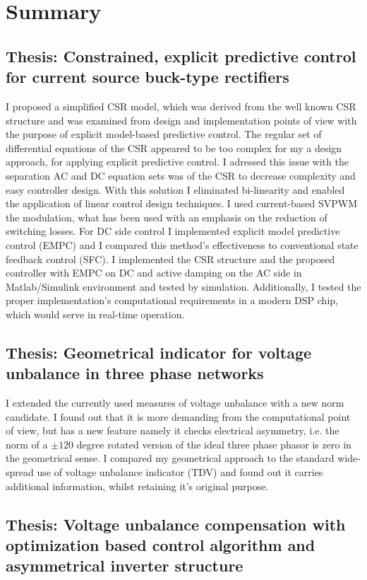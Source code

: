 \chapter{Summary}

\section{Thesis: Constrained, explicit predictive control for current source buck-type rectifiers}

    I proposed a simplified CSR model, which was derived from the well known CSR structure and was examined from design and implementation points of view with the purpose of explicit model-based predictive control. The regular set of differential equations of the CSR appeared to be too complex for my a design approach, for applying explicit predictive control. I adressed this issue with the separation AC and DC equation sets was of the CSR to decrease complexity and easy controller design. With this solution I eliminated bi-linearity and enabled the application of linear control design techniques. I used current-based SVPWM the modulation, what has been used with an emphasis on the reduction of switching losses. For DC side control I implemented explicit model predictive control (EMPC) and I compared this method's effectiveness to conventional state feedback control (SFC). I implemented the CSR structure and the proposed controller with EMPC on DC and active damping on the AC side in Matlab/Simulink environment and tested by simulation. Additionally, I tested the proper implementation's computational requirements in a modern DSP chip, which would serve in real-time operation.
		
\section{Thesis: Geometrical indicator for voltage unbalance in three phase networks}
    I extended the currently used measures of voltage unbalance with a new norm candidate. I found out that it is more demanding from the computational point of view, but has a new feature namely it checks electrical asymmetry, i.e. the norm of a $\pm120$ degree rotated version of the ideal three phase phasor is zero in the geometrical sense. I compared my geometrical approach to the standard wide-spread use of voltage unbalance indicator (TDV) and found out it carries additional information, whilst retaining it's original purpose.
		
\section{Thesis: Voltage unbalance compensation with optimization based control algorithm and asymmetrical inverter structure}

